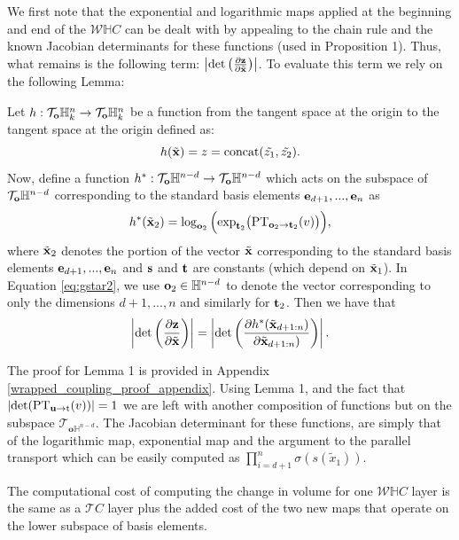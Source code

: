 \begin{proofsketch}
We first note that the exponential and logarithmic maps applied at the beginning and end of the $\mathcal{W}\mathbb{H}C$ can be dealt with by appealing to the chain rule and the known Jacobian determinants for these functions (used in Proposition 1).  
Thus, what remains is the following term: $\left|\textrm{det}\left(\frac{\partial \mathbf{z}}{\partial \tilde{\mathbf{x}}}\right)\right|$. To evaluate this term we rely on the following Lemma:
\begin{lemma}
Let $h : \mathcal{T}_{\mathbf{o}}\mathbb{H}^n_k \rightarrow \mathcal{T}_{\mathbf{o}}\mathbb{H}^n_k$ be a function from the tangent space at the origin to the tangent space at the origin defined as:
\begin{equation}\label{eq:g2}
h(\tilde{\mathbf{x}}) = z = \textnormal{concat}(\tilde{z_1}, \tilde{z_2}).
\end{equation}
Now, define a function $h^* : \mathcal{T}_{\mathbf{o}}\mathbb{H}^{n-d} \rightarrow \mathcal{T}_{\mathbf{o}}\mathbb{H}^{n-d}$ which acts on the subspace of $\mathcal{T}_{\mathbf{o}}\mathbb{H}^{n-d}$ corresponding to the standard basis elements $\mathbf{e}_{d+1}, ..., \mathbf{e}_n$ as
\begin{equation}\label{eq:gstar2}
h^*(\tilde{\mathbf{x}}_{2}) =   \log_{\mathbf{o}_{2}}\Big( \textnormal{exp}_{\mathbf{t}_{2}}\big(\textnormal{PT}_{\mathbf{o}_{2} \to \mathbf{t}_{2}}(v)\big)\Big),
\end{equation}
where $\tilde{\mathbf{x}}_{2}$ denotes the portion of the vector $\tilde{\mathbf{x}}$ corresponding to the standard basis elements $\mathbf{e}_{d+1}, ..., \mathbf{e}_n$ and $\mathbf{s}$ and $\mathbf{t}$ are constants (which depend on $\tilde{\mathbf{x}}_{1}$).
In Equation \eqref{eq:gstar2}, we use $\mathbf{o}_{2} \in \mathbb{H}^{n-d}$ to denote the vector corresponding to only the dimensions $d+1, ..., n$ and similarly for $\mathbf{t}_{2}$.
Then we have that
\begin{equation}
    \left|\textnormal{det}\left(\frac{\partial \mathbf{z}}{\partial \tilde{\mathbf{x}}}\right)\right| =    \left|\textnormal{det}\left(\frac{\partial h^*(\tilde{\mathbf{x}}_{d+1:n})}{\partial \tilde{\mathbf{x}}_{d+1:n})}\right)\right|.
\end{equation}
\end{lemma}
The proof for Lemma 1 is provided in Appendix \ref{wrapped_coupling_proof_appendix}. Using Lemma 1, and the fact that $|\textnormal{det}(\textnormal{PT}_{\textbf{u}\to\textnormal{t}}(v))| = 1$ \cite{nagano2019wrapped} we are left with another composition of functions but on the subspace $\mathcal{T}_{\textbf{o}\mathbb{H}^{n-d}}$. The Jacobian determinant for these functions, are simply that of the logarithmic map, exponential map and the argument to the parallel transport which can be easily computed as $\prod_{i=d+1}^n \sigma(s(\tilde{x}_1))$. 
\end{proofsketch}
The computational cost of computing the change in volume for one $\mathcal{W}\mathbb{H}C$ layer is the same as a $\mathcal{T}C$ layer plus the added cost of the two new maps that operate on the lower subspace of basis elements.
